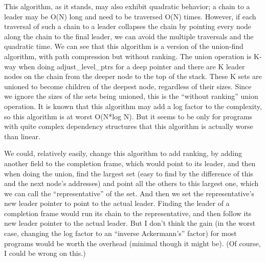 This algorithm, as it stands, may also exhibit quadratic behavior; a
chain to a leader may be O(N) long and need to be traversed O(N)
times.  However, if each traversal of such a chain to a leader
collapses the chain by pointing every node along the chain to the
final leader, we can avoid the multiple traversals and the quadratic
time.  We can see that this algorithm is a version of the union-find
algorithm, with path compression but without ranking.  The union
operation is K-way when doing adjust\_level\_ptrs for a deep pointer
and there are K leader nodes on the chain from the deeper node to the
top of the stack.  These K sets are unioned to become children of the
deepest node, regardless of their sizes.  Since we ignore the sizes of
the sets being unioned, this is the ``without ranking'' union
operation.  It is known that this algorithm may add a log factor to
the complexity, so this algorithm is at worst O(N*log N).  But it
seems to be only for programs with quite complex dependency structures
that this algorithm is actually worse than linear.

We could, relatively easily, change this algorithm to add ranking, by
adding another field to the completion frame, which would point to its
leader, and then when doing the union, find the largest set (easy to
find by the difference of this and the next node's addresses) and
point all the others to this largest one, which we can call the
``representative'' of the set.  And then we set the representative's
new leader pointer to point to the actual leader.  Finding the leader
of a completion frame would run its chain to the representative, and
then follow its new leader pointer to the actual leader.  But I don't
think the gain (in the worst case, changing the log factor to an
``inverse Ackermann's'' factor) for most programs would be worth the
overhead (minimal though it might be).  (Of course, I could be wrong
on this.)

